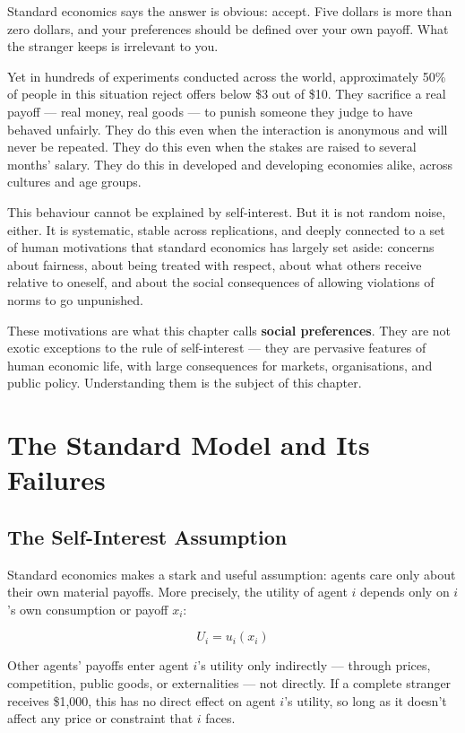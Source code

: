 \documentclass[12pt, letterpaper]{article}
\begin{document}
Standard economics says the answer is obvious: accept. Five dollars is more than zero dollars, and your preferences should be defined over your own payoff. What the stranger keeps is irrelevant to you.

Yet in hundreds of experiments conducted across the world, approximately 50\% of people in this situation reject offers below \$3 out of \$10. They sacrifice a real payoff --- real money, real goods --- to punish someone they judge to have behaved unfairly. They do this even when the interaction is anonymous and will never be repeated. They do this even when the stakes are raised to several months' salary. They do this in developed and developing economies alike, across cultures and age groups.

This behaviour cannot be explained by self-interest. But it is not random noise, either. It is systematic, stable across replications, and deeply connected to a set of human motivations that standard economics has largely set aside: concerns about fairness, about being treated with respect, about what others receive relative to oneself, and about the social consequences of allowing violations of norms to go unpunished.

These motivations are what this chapter calls \textbf{social preferences}. They are not exotic exceptions to the rule of self-interest --- they are pervasive features of human economic life, with large consequences for markets, organisations, and public policy. Understanding them is the subject of this chapter.

\newpage


\section{The Standard Model and Its Failures}



\subsection{The Self-Interest Assumption}


Standard economics makes a stark and useful assumption: agents care only about their own material payoffs. More precisely, the utility of agent $i$ depends only on $i$'s own consumption or payoff $x_i$:

$$U_i = u_i(x_i)$$

Other agents' payoffs enter agent $i$'s utility only indirectly --- through prices, competition, public goods, or externalities --- not directly. If a complete stranger receives \$1,000, this has no direct effect on agent $i$'s utility, so long as it doesn't affect any price or constraint that $i$ faces.
\end{document}
